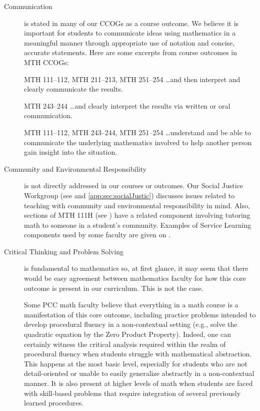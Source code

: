 \begin{description}
\item[Communication] is stated in many of our CCOGs as a course outcome. We
  believe it is important for students to communicate ideas using mathematics in
  a meaningful manner through appropriate use of notation and concise, accurate
  statements.  Here are some excerpts from course outcomes in MTH CCOGs: 
\begin{aquote}{MTH 111--112, MTH 211--213, MTH 251--254}
{\ldots}and then interpret and clearly communicate the results. 
\end{aquote}

\begin{aquote}{MTH 243--244}
{\ldots}and clearly interpret the results via written or oral communication. 
\end{aquote}

\begin{aquote}{MTH 111--112, MTH 243--244, MTH 251--254}
{\ldots}understand and be able to communicate the underlying mathematics
involved to help another person gain insight into the situation.
\end{aquote}

\item[Community and Environmental Responsibility] is not directly addressed in
  our courses or outcomes. Our Social Justice Workgroup
  (see  and \vref{app:sec:socialJustic}) discusses issues
  related to teaching with community and environmental responsibility in mind.
  Also, sections of MTH 111H (see ) have a related component
  involving tutoring math to someone in a student's community. Examples of 
  Service Learning components used by some faculty are given on .

\item[Critical Thinking and Problem Solving] 
is fundamental to mathematics so, at first glance, it may seem that there would
be easy agreement between mathematics faculty for how this core outcome is
present in our curriculum. This is not the case.
 
Some PCC math faculty believe that everything in a math course is a
manifestation of this core outcome, including practice problems intended to
develop procedural fluency in a non-contextual setting (e.g., solve the quadratic
equation by the Zero Product Property). Indeed, one can certainly witness the
critical analysis required within the realm of procedural fluency when students
struggle with  mathematical abstraction. This happens at the most basic level,
especially for students who are not detail-oriented or unable to easily
generalize abstractly in a non-contextual manner. It is also present at higher
levels of math when students are faced with skill-based problems that require
integration of several previously learned procedures. 


\end{description}
